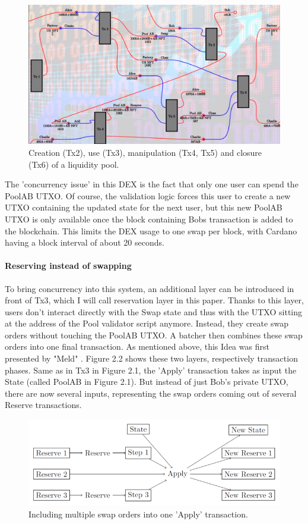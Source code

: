 \documentclass[a4paper,twoside,12pt]{report}
\begin{document}
\begin{figure}[h]
\centering
\includegraphics[scale=0.35]{Swap}
\caption{Creation (Tx2), use (Tx3), manipulation (Tx4, Tx5) and closure (Tx6) of a liquidity pool.}
\end{figure}

The 'concurrency issue' in this DEX is the fact that only one user can spend the PoolAB UTXO. Of course, the validation logic forces this user to create a new UTXO containing the updated state for the next user, but this new PoolAB UTXO is only available once the block containing Bobs transaction is added to the blockchain. This limits the DEX usage to one swap per block, with Cardano having a block interval of about 20 seconds.

\paragraph{Reserving instead of swapping} To bring concurrency into this system, an additional layer can be introduced in front of Tx3, which I will call reservation layer in this paper. Thanks to this layer, users don't interact directly with the Swap state and thus with the UTXO sitting at the address of the Pool validator script anymore. Instead, they create swap orders without touching the PoolAB UTXO. A batcher then combines these swap orders into one final transaction.
As mentioned above, this Idea was first presented by "Meld" \cite{meldConcurrencySolution}. Figure 2.2 shows these two layers, respectively transaction phases. Same as in Tx3 in Figure 2.1, the 'Apply' transaction takes as input the State (called PoolAB in Figure 2.1). But instead of just Bob's private UTXO, there are now several inputs, representing the swap orders coming out of several Reserve transactions.  

\begin{figure}[h]
\centering
\includegraphics[scale=0.6]{meld_swap}
\caption{Including multiple swap orders into one 'Apply' transaction.}
\end{figure}
\end{document}
